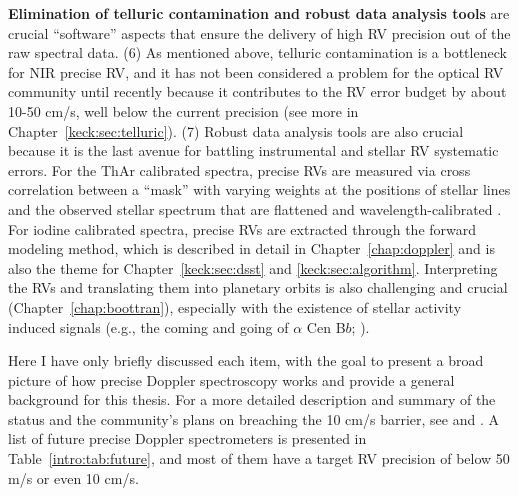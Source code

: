 {\bf Elimination of telluric contamination and robust data analysis
tools} are crucial ``software'' aspects that ensure the delivery of
high RV precision out of the raw spectral data. (6) As mentioned
above, telluric contamination is a bottleneck for NIR precise RV, and
it has not been considered a problem for the optical RV community
until recently because it contributes to the RV error budget by about
10-50 cm/s, well below the current precision (see more in
Chapter~\ref{keck:sec:telluric}). (7) Robust data analysis tools are
also crucial because it is the last avenue for battling instrumental
and stellar RV systematic errors. For the ThAr calibrated spectra,
precise RVs are measured via cross correlation between a ``mask'' with
varying weights at the positions of stellar lines and the observed
stellar spectrum that are flattened and wavelength-calibrated
\citep{elodie,2002Msngr.110....9P}. For iodine calibrated spectra,
precise RVs are extracted through the forward modeling method, which
is described in detail in Chapter~\ref{chap:doppler} and is also the
theme for Chapter~\ref{keck:sec:dsst} and
\ref{keck:sec:algorithm}. Interpreting the RVs and translating them
into planetary orbits is also challenging and crucial
(Chapter~\ref{chap:boottran}), especially with the existence of
stellar activity induced signals (e.g., the coming and going of
$\alpha$ Cen B$b$; \citealt{2012Natur.491..207D,
2016MNRAS.456L...6R}).

Here I have only briefly discussed each item, with the goal to present
a broad picture of how precise Doppler spectroscopy works and provide
a general background for this thesis. For a more detailed description
and summary of the status and the community's plans on breaching the
10 cm/s barrier, see \cite{exopag2015} and \cite{eprv2015}. A list of
future precise Doppler spectrometers is presented in
Table~\ref{intro:tab:future}, and most of them have a target RV
precision of below 50 m/s or even 10 cm/s.


